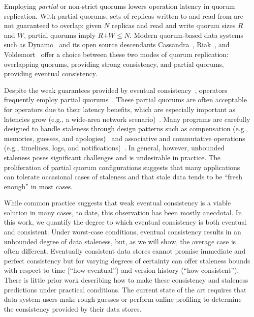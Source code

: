 \documentclass{vldb}
\begin{document}
Employing \textit{partial} or non-strict quorums lowers operation
latency in quorum replication.  With partial quorums, sets of replicas
written to and read from are not guaranteed to overlap: given $N$
replicas and read and write quorum sizes $R$ and $W$, partial quorums
imply $R$$+$$W$$\leq$$N$.  Modern quorum-based data systems such as
Dynamo~\cite{dynamo} and its open source descendants
Cassandra~\cite{cassandra}, Riak~\cite{riak}, and
Voldemort~\cite{voldemort} offer a choice between these two modes of
quorum replication: overlapping quorums, providing strong consistency,
and partial quorums, providing eventual consistency.

Despite the weak guarantees provided by eventual
consistency~\cite{hamilton-cap, cops, walter}, operators frequently
employ partial quorums~\cite{cassandra, cassandra-docs,
  cassandradefault,feinbergpc,reddit, outbrain, maxperfblog}.  These
partial quorums are often acceptable for operators due to their
latency benefits, which are especially important as latencies grow
(e.g., a wide-area network scenario)~\cite{abadilatconsist,
  feinbergpc, hamilton-cap, helland}. Many programs are carefully
designed to handle staleness through design patterns such as
compensation (e.g., memories, guesses, and apologies)~\cite{helland}
and associative and commutative operations (e.g., timelines, logs, and
notifications)~\cite{calm}.  In general, however, unbounded staleness
poses significant challenges and is undesirable in practice.  The
proliferation of partial quorum configurations suggests that many
applications can tolerate occasional cases of staleness and that stale
data tends to be ``fresh enough'' in most cases.

While common practice suggests that weak eventual consistency is a
viable solution in many cases, to date, this observation has been
mostly anecdotal. In this work, we quantify the degree to which
eventual consistency is both eventual and consistent. Under worst-case
conditions, eventual consistency results in an unbounded degree of
data staleness, but, as we will show, the average case is often
different.  Eventually consistent data stores cannot promise immediate
and perfect consistency but for varying degrees of certainty can offer
staleness bounds with respect to time (``how eventual'') and version
history (``how consistent'').  There is little prior work describing
how to make these consistency and staleness predictions under
practical conditions.  The current state of the art requires that data
system users make rough guesses or perform online profiling to
determine the consistency provided by their data stores.
\end{document}
